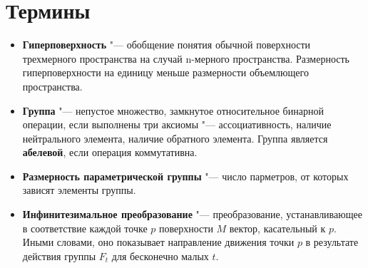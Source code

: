 \documentclass[a4paper,14pt]{extarticle}
\begin{document}
\clearpage
{}{}
\appendix
\section{Термины}
\begin{itemize}
\item \textbf{Гиперповерхность} "--- обобщение понятия обычной поверхности трехмерного пространства на случай n-мерного пространства. Размерность гиперповерхности на единицу меньше размерности объемлющего пространства.

\item \textbf{Группа} "--- непустое множество, замкнутое относительное бинарной операции, если выполнены три аксиомы "--- ассоциативность, наличие нейтрального элемента, наличие обратного элемента. Группа является \textbf{абелевой}, если операция коммутативна.

\item \textbf{Размерность параметрической группы} "--- число парметров, от которых зависят элементы группы.

\item \textbf{Инфинитезимальное преобразование} "--- преобразование, устанавливающее в соответствие каждой точке $p$ поверхности $M$ вектор, касательный к $p$. Иными словами, оно показывает направление движения точки $p$ в результате действия группы $F_t$ для бесконечно малых $t$.

\end{itemize}
\end{document}
